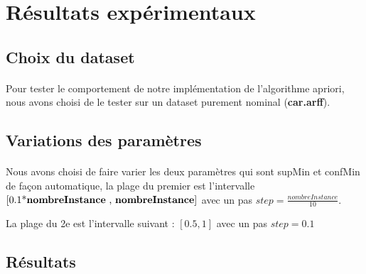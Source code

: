 	\section{Résultats expérimentaux}
		\subsection{Choix du dataset}
			\paragraph{}
			Pour tester le comportement de notre implémentation de l'algorithme apriori, nous avons choisi de le tester sur un dataset purement nominal (\textbf{car.arff}).
		\subsection{Variations des paramètres}
			\paragraph{}
			Nous avons choisi de faire varier les deux paramètres qui sont supMin et confMin de façon automatique, la plage du premier est l'intervalle $\left[ \text{0.1*\textbf{nombreInstance} , \textbf{nombreInstance}} \right]$ avec un pas $step = \frac{ nombreInstance}{10}$.
			\par 
			La plage du 2e est l'intervalle suivant : $\left[ 0.5 , 1\right]$ avec un pas $step = 0.1$
		\subsection{Résultats}
